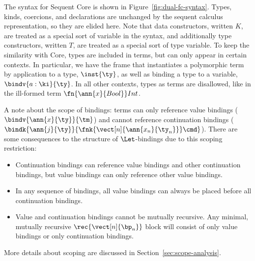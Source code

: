 \documentclass{article}
\begin{document}
The syntax for Sequent Core is shown in Figure~\ref{fig:dual-fc-syntax}.  Types,
kinds, coercions, and declarations are unchanged by the sequent calculus
representation, so they are elided here.  Note that data constructors, written
$K$, are treated as a special sort of variable in the syntax, and additionally
type constructors, written $T$, are treated as a special sort of type variable.
To keep the similarity with Core, types are included in terms, but can only
appear in certain contexts.  In particular, we have the frame that instantiates
a polymorphic term by application to a type, $\inst{\ty}$, as well as binding a
type to a variable, $\bindv{a:\ki}{\ty}$.  In all other contexts, types as terms
are disallowed, like in the ill-formed term $\fn{\ann{x}{Bool}}Int$.

A note about the scope of bindings: terms can only reference value bindings
($\bindv{\ann{x}{\ty}}{\tm}$) and cannot reference continuation bindings
($\bindk{\ann{j}{\ty}}{\fnk{\vect[n]{\ann{x_n}{\ty_n}}}\cmd}$).  There are some
consequences to the structure of $\Let$-bindings due to this scoping
restriction:
\begin{itemize}
\item Continuation bindings can reference value bindings and other continuation
  bindings, but value bindings can only reference other value bindings.
\item In any sequence of bindings, all value bindings can always be placed
  before all continuation bindings.
\item Value and continuation bindings cannot be mutually recursive.  Any
  minimal, mutually recursive $\rec{\vect[n]{\bp_n}}$ block will consist of only
  value bindings or only continuation bindings.
\end{itemize}
More details about scoping are discussed in Section~\ref{sec:scope-analysis}.
\end{document}
